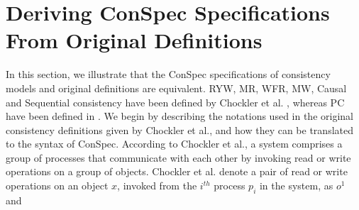 \documentclass[journal,compsoc]{IEEEtran}
\begin{document}
 
 \section{Deriving ConSpec Specifications From Original Definitions}\label{sec:derive}
  In this section, %
  we illustrate that %
  the ConSpec specifications of  consistency models  and original definitions \cite{Chockler2000, Ahamad:1993:PPC:165231.165264, Owens:2009:BXM:1616077.1616107} are equivalent.  RYW, MR, WFR, MW, Causal and Sequential consistency have been defined by Chockler et al. \cite{Chockler2000}, whereas PC have been defined in \cite{Ahamad:1993:PPC:165231.165264, Owens:2009:BXM:1616077.1616107}. 
   We begin by describing the  notations used in the original consistency definitions given by Chockler et al., and how they can be translated to %
  the syntax of ConSpec.  According to Chockler et al., a system comprises a group of processes that communicate with each other by invoking read or write operations on a group of objects. 
  Chockler et al. denote   a pair of  read or write operations on an object $x$, invoked from %
 the $i^{th}$  process $ p_i$ in the system, as $\mathit{o}^1$ and
\end{document}
